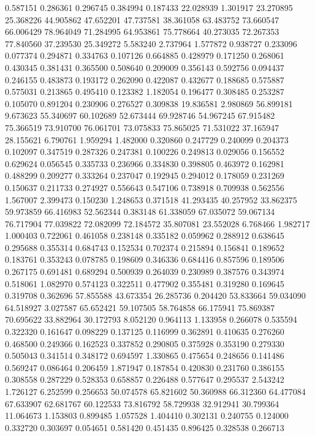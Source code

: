 0.587151
0.286361
0.296745
0.384994
0.187433
22.028939
1.301917
23.270895
25.368226
44.905862
47.652201
47.737581
38.361058
63.483752
73.660547
66.006429
78.964049
71.284995
64.953861
75.778664
40.273035
72.267353
77.840560
37.239530
25.349272
5.583240
2.737964
1.577872
0.938727
0.233096
0.077374
0.294871
0.334763
0.107126
0.664885
0.428979
0.171250
0.268061
0.430345
0.381431
0.365500
0.508640
0.209009
0.356143
0.592756
0.094437
0.246155
0.483873
0.193172
0.262090
0.422087
0.432677
0.188685
0.575887
0.575031
0.213865
0.495410
0.123382
1.182054
0.196477
0.308485
0.253287
0.105070
0.891204
0.230906
0.276527
0.309838
19.836581
2.980869
56.899181
9.673623
55.340697
60.102689
52.673444
69.928746
54.967245
67.915482
75.366519
73.910700
76.061701
73.075833
75.865025
71.531022
37.165947
28.155621
6.790761
1.959294
1.482000
0.320860
0.247729
0.240099
0.204373
0.102097
0.347519
0.287326
0.247381
0.100226
0.249813
0.029056
0.156552
0.629624
0.056545
0.335733
0.236966
0.334830
0.398805
0.463972
0.162981
0.488299
0.209277
0.333264
0.237047
0.192945
0.294012
0.178059
0.231269
0.150637
0.211733
0.274927
0.556643
0.547106
0.738918
0.709938
0.562556
1.567007
2.399473
0.150230
1.248653
0.371518
41.293435
40.257952
33.862375
59.973859
66.416983
52.562344
0.383148
61.338059
67.035072
59.067134
76.717904
77.039822
72.082099
72.184572
35.807081
23.552028
6.768466
1.982717
1.000403
0.722061
0.461058
0.238148
0.335182
0.059962
0.288912
0.638645
0.295688
0.355314
0.684743
0.152534
0.702374
0.215894
0.156841
0.189652
0.183761
0.353243
0.078785
0.198609
0.346336
0.684416
0.857596
0.189506
0.267175
0.691481
0.689294
0.500939
0.264039
0.230989
0.387576
0.343974
0.518061
1.082970
0.574123
0.322511
0.477902
0.355481
0.319280
0.169645
0.319708
0.362696
57.855588
43.673354
26.285736
0.204420
53.833664
59.034090
64.518927
3.027587
65.652421
59.107505
58.764858
66.175941
75.869387
70.695622
33.882964
30.172793
8.052120
0.964113
1.133958
0.266078
0.535594
0.322320
0.161647
0.098229
0.137125
0.116999
0.362891
0.410635
0.276260
0.468500
0.249366
0.162523
0.337852
0.290805
0.375928
0.353190
0.279330
0.505043
0.341514
0.348172
0.694597
1.330865
0.475654
0.248656
0.141486
0.569247
0.086464
0.206459
1.871947
0.187854
0.420830
0.231760
0.386155
0.308558
0.287229
0.528353
0.658857
0.226488
0.577647
0.295537
2.543242
1.726127
6.252599
0.256653
50.074578
65.821602
50.360988
66.312360
64.477084
67.633907
62.681767
60.122533
73.816792
58.729938
32.912941
30.799364
11.064673
1.153803
0.899485
1.057528
1.404410
0.302131
0.240755
0.124000
0.332720
0.303697
0.054651
0.581420
0.451435
0.896425
0.328538
0.266713
